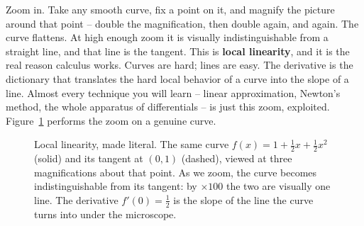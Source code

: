 \begin{intuitionbox}
Zoom in. Take any smooth curve, fix a point on it, and magnify the picture around
that point -- double the magnification, then double again, and again. The curve
flattens. At high enough zoom it is visually indistinguishable from a straight
line, and that line is the tangent. This is \textbf{local linearity}, and it is
the real reason calculus works. Curves are hard; lines are easy. The derivative is
the dictionary that translates the hard local behavior of a curve into the slope
of a line. Almost every technique you will learn -- linear approximation,
Newton's method, the whole apparatus of differentials -- is just this zoom,
exploited. Figure~\ref{ch10:fig-zoom} performs the zoom on a genuine curve.
\end{intuitionbox}

\begin{figure}[h]
\centering
{}
\caption{Local linearity, made literal. The same curve
$f(x)=1+\tfrac12 x+\tfrac12 x^2$ (solid) and its tangent at $(0,1)$ (dashed),
viewed at three magnifications about that point. As we zoom, the curve becomes
indistinguishable from its tangent: by $\times 100$ the two are visually one
line. The derivative $f'(0)=\tfrac12$ is the slope of the line the curve turns
into under the microscope.}
\label{ch10:fig-zoom}
\end{figure}

